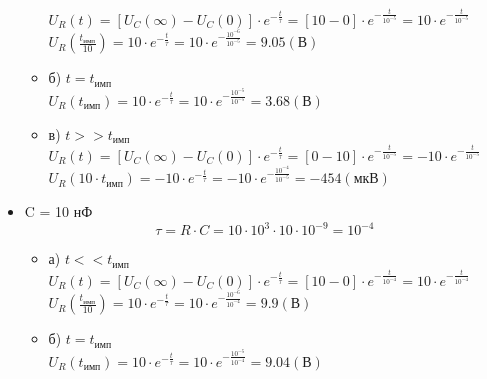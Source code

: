 \begin{itemize}
\begin{itemize}
		$U_R(t) = [U_C(\infty) - U_C(0)] \cdot e^{-\frac{t}{\tau}} = [10 - 0] \cdot e^{-\frac{t}{10^{-5}}} = 10 \cdot e^{-\frac{t}{10^{-5}}}$\\

		$U_R(\frac{t_\text{имп}}{10}) = 10 \cdot e^{-\frac{t}{\tau}} = 10 \cdot e^{-\frac{10^{-6}}{10^{-5}}} = 9.05 (\text{В})$\\

\item[] б) $t = t_\text{имп}$\\

		$U_R(t_\text{имп}) = 10 \cdot e^{-\frac{t}{\tau}} = 10 \cdot e^{-\frac{10^{-5}}{10^{-5}}} = 3.68 (\text{В})$\\

	
\item[] в) $t >> t_\text{имп}$\\

		$U_R(t) = [U_C(\infty) - U_C(0)] \cdot e^{-\frac{t}{\tau}} = [0 - 10] \cdot e^{-\frac{t}{10^{-5}}} = -10 \cdot e^{-\frac{t}{10^{-5}}}$\\

		$U_R(10 \cdot t_\text{имп}) = -10 \cdot e^{-\frac{t}{\tau}} = -10 \cdot e^{-\frac{10^{-4}}{10^{-5}}} = -454 (\text{мкВ})$\\

\end{itemize}

\item C = 10 нФ\\
\begin{equation}
		\tau = R \cdot C = 10 \cdot 10^3 \cdot 10 \cdot 10^{-9} = 10^{-4}
\end{equation}
\begin{itemize}
\item[] а) $t << t_\text{имп}$\\

		$U_R(t) = [U_C(\infty) - U_C(0)] \cdot e^{-\frac{t}{\tau}} = [10 - 0] \cdot e^{-\frac{t}{10^{-4}}} = 10 \cdot e^{-\frac{t}{10^{-4}}}$\\

		$U_R(\frac{t_\text{имп}}{10}) = 10 \cdot e^{-\frac{t}{\tau}} = 10 \cdot e^{-\frac{10^{-6}}{10^{-4}}} = 9.9 (\text{В})$\\

\item[] б) $t = t_\text{имп}$\\

		$U_R(t_\text{имп}) = 10 \cdot e^{-\frac{t}{\tau}} = 10 \cdot e^{-\frac{10^{-5}}{10^{-4}}} = 9.04 (\text{В})$\\
	

\end{itemize}
\end{itemize}
